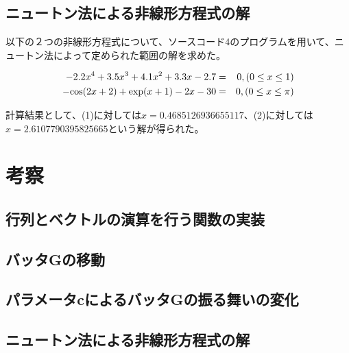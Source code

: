 \documentclass[11pt]{ltjsarticle}
\begin{document}
\subsection{ニュートン法による非線形方程式の解}

以下の２つの非線形方程式について、ソースコード4のプログラムを用いて、ニュートン法によって定められた範囲の解を求めた。

\begin{eqnarray}
	- 2.2 x^4 + 3.5x^3 + 4.1x^2 + 3.3x - 2.7 & = & 0, (0 \leq x \leq 1) \\
	- {\rm cos}(2x+2) + {\rm exp}(x+1) - 2x -30 & = & 0, (0 \leq x \leq \pi)
\end{eqnarray}

計算結果として、(1)に対しては$x = 0.4685126936655117$、(2)に対しては$x = 2.6107790395825665$という解が得られた。

\section{考察}

\subsection{行列とベクトルの演算を行う関数の実装}
\subsection{バッタGの移動}
\subsection{パラメータcによるバッタGの振る舞いの変化}
\subsection{ニュートン法による非線形方程式の解}
\end{document}
